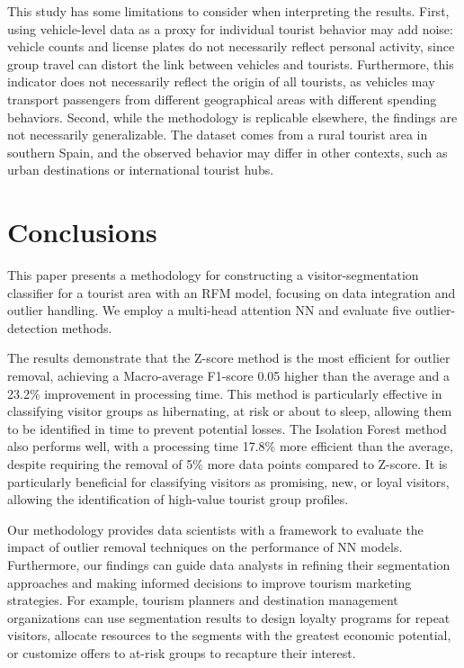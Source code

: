 \documentclass{ws-ijitdm}
\begin{document}
{\color{black} This study has some limitations to consider when interpreting the results. First, using vehicle-level data as a proxy for individual tourist behavior may add noise: vehicle counts and license plates do not necessarily reflect personal activity, since group travel can distort the link between vehicles and tourists. Furthermore, this indicator does not necessarily reflect the origin of all tourists, as vehicles may transport passengers from different geographical areas with different spending behaviors. Second, while the methodology is replicable elsewhere, the findings are not necessarily generalizable. The dataset comes from a rural tourist area in southern Spain, and the observed behavior may differ in other contexts, such as urban destinations or international tourist hubs.}


\section{Conclusions} \label{sec:conclusion}

This paper presents a methodology for constructing a {\color{black}visitor-segmentation classifier for a tourist area with an RFM model, focusing on data integration and outlier handling. We employ a multi-head attention NN and evaluate five outlier-detection methods.}

The results demonstrate that the Z-score method is the most efficient for outlier removal, achieving a Macro-average F1-score 0.05 higher than the average and a 23.2\% improvement in processing time. This method is particularly effective in classifying visitor groups {\color{black}as hibernating, at risk or about to sleep, allowing them to be identified in time to prevent potential losses.} The Isolation Forest method also performs well, with a processing time 17.8\% more efficient than the average, despite requiring the removal of 5\% more data points compared to Z-score. It is particularly beneficial for classifying {\color{black}visitors} as promising, new, or loyal visitors{\color{black}, allowing the identification of high-value tourist group profiles.}

Our methodology provides data scientists with a framework to evaluate the impact of outlier removal techniques on the performance of NN models. {\color{black}Furthermore, our findings can guide data analysts in refining their segmentation approaches and making informed decisions to improve tourism marketing strategies. For example, tourism planners and destination management organizations can use segmentation results to design loyalty programs for repeat visitors, allocate resources to the segments with the greatest economic potential, or customize offers to at-risk groups to recapture their interest.}
\end{document}
